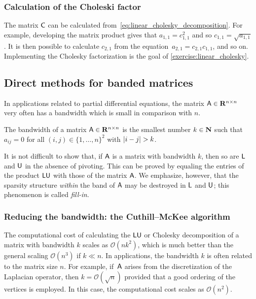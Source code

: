 \subsubsection*{Calculation of the Choleski factor}%

The matrix $\mathsf C$ can be calculated from~\eqref{eq:linear_cholesky_decomposition}.
For example, developing the matrix product gives that $a_{1,1} = c_{1, 1}^2$ and so $c_{1, 1} = \sqrt{a_{1,1}}$.
It is then possible to calculate $c_{2,1}$ from the equation~$a_{2, 1} = c_{2, 1} c_{1, 1}$, and so on.
Implementing the Cholesky factorization is the goal of \cref{exercise:linear_cholesky}.

\subsection{Direct methods for banded matrices}%

In applications related to partial differential equations,
the matrix $\mathsf A \in \mathbf R^{n \times n}$ very often has a bandwidth which is small in comparison with $n$.
\begin{definition}
    The bandwidth of a matrix $\mathsf A \in \mathbf R^{n \times n}$ is the smallest number $k \in \mathbf N$ such that
    $a_{ij} = 0$ for all $(i, j) \in \{1, \dotsc, n\}^2$ with $\lvert i - j\rvert > k$.
\end{definition}
It is not difficult to show that,
if $\mathsf A$ is a matrix with bandwidth $k$,
then so are $\mathsf L$ and $\mathsf U$ in the absence of pivoting.
This can be proved by equaling the entries of the product $\mathsf L \mathsf U$ with those of the matrix $\mathsf A$.
We emphasize, however, that the sparsity structure \emph{within} the band of $\mathsf A$ may be destroyed in $\mathsf L$ and $\mathsf U$;
this phenomenon is called \emph{fill-in}.

\subsubsection{Reducing the bandwidth: the Cuthill--McKee algorithm}%
\label{ssub:reducing_the_bandwidth_the_cuthill_mckee_algorithm}

The computational cost of calculating the $\mathsf L \mathsf U$ or Cholesky decomposition of a matrix with bandwidth $k$ scales as $\mathcal O(n k^2)$,
which is much better than the general scaling $\mathcal O(n^3)$ if $k \ll n$.
In applications, the bandwidth $k$ is often related to the matrix size $n$.
For example, if~$\mathsf A$ arises from the discretization of the Laplacian operator, then $k = \mathcal O(\sqrt{n})$
provided that a good ordering of the vertices is employed.
In this case, the computational cost scales as $\mathcal O(n^2)$.

